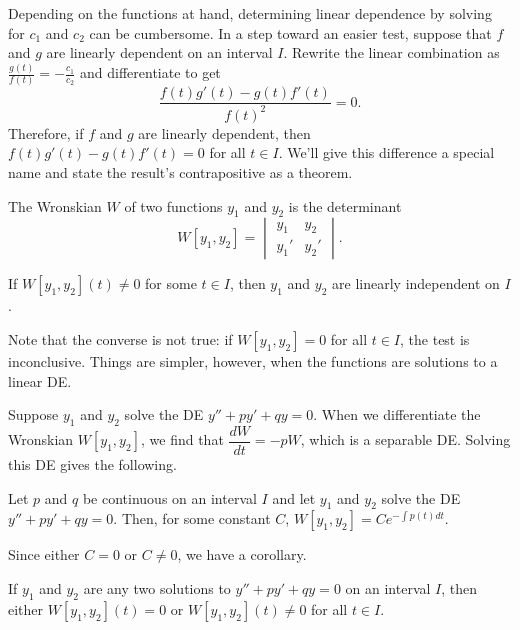 \documentclass[../m82main.tex]{subfiles}
\begin{document}
Depending on the functions at hand, determining linear dependence by solving for $c_1$ and $c_2$ can be cumbersome.
In a step toward an easier test, suppose that $f$ and $g$ are linearly dependent on an interval $I$.
Rewrite the linear combination as $\displaystyle \frac{g(t)}{f(t)} = -\frac{c_1}{c_2}$ and differentiate to get
\[ \frac{f(t)g'(t) - g(t)f'(t)}{f(t)^2} = 0. \]
Therefore, if $f$ and $g$ are linearly dependent, then $f(t)g'(t) - g(t)f'(t) = 0$ for all $t \in I$.
We'll give this difference a special name and state the result's contrapositive as a theorem.

\begin{definition}[Wronskian]
    The Wronskian $W$ of two functions $y_1$ and $y_2$ is the determinant
    \[ W[y_1, y_2] = \begin{vmatrix} y_1 & y_2 \\ y_1' & y_2' \end{vmatrix}. \]
\end{definition}

\begin{theorem}
    If $W[y_1, y_2](t) \neq 0$ for some $t \in I$, then $y_1$ and $y_2$ are linearly independent on $I$.
\end{theorem}

Note that the converse is not true: if $W[y_1, y_2] = 0$ for all $t \in I$, the test is inconclusive.
Things are simpler, however, when the functions are solutions to a linear DE.

Suppose $y_1$ and $y_2$ solve the DE $y'' + py' + qy = 0$.
When we differentiate the Wronskian $W[y_1, y_2]$, we find that $\dfrac{dW}{dt} = -pW$, which is a separable DE.
Solving this DE gives the following.

\begin{theorem}
    Let $p$ and $q$ be continuous on an interval $I$ and let $y_1$ and $y_2$ solve the DE $y'' + py' + qy = 0$.
    Then, for some constant $C$, $W[y_1, y_2] = Ce^{-\int p(t) dt}$.
\end{theorem}

Since either $C = 0$ or $C \neq 0$, we have a corollary.

\begin{corollary}[$W(t_0) = 0$ implies identially zero]
    If $y_1$ and $y_2$ are any two solutions to $y'' + py' + qy = 0$ on an interval $I$, then either $W[y_1, y_2](t) = 0$ or $W[y_1, y_2](t) \neq 0$ for all $t \in I$.
\end{corollary}
\end{document}
